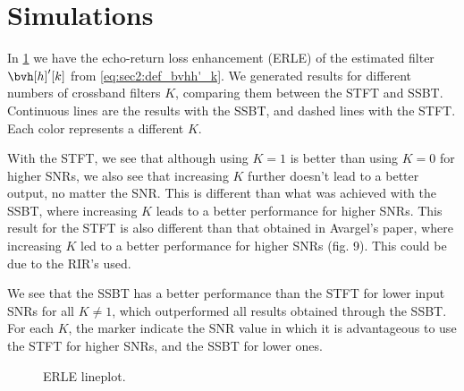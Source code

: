 
\section{Simulations}

In \cref{fig:sec4:lineplot_erle} we have the echo-return loss enhancement (ERLE) of the estimated filter $\bvh[h]'[k]$ from \cref{eq:sec2:def_bvhh'_k}. We generated results for different numbers of crossband filters $K$, comparing them between the STFT and SSBT. Continuous lines are the results with the SSBT, and dashed lines with the STFT. Each color represents a different $K$.

With the STFT, we see that although using $K=1$ is better than using $K=0$ for higher SNRs, we also see that increasing $K$ further doesn't lead to a better output, no matter the SNR. This is different than what was achieved with the SSBT, where increasing $K$ leads to a better performance for higher SNRs. This result for the STFT is also different than that obtained in Avargel's paper, where increasing $K$ led to a better performance for higher SNRs (fig. 9). This could be due to the RIR's used.

We see that the SSBT has a better performance than the STFT for lower input SNRs for all $K \neq 1$, which outperformed all results obtained through the SSBT. For each $K$, the marker indicate the SNR value in which it is advantageous to use the STFT for higher SNRs, and the SSBT for lower ones.

\begin{figure}[H]
	\centering
	
	\caption{ERLE lineplot.}
	\label{fig:sec4:lineplot_erle}
\end{figure}